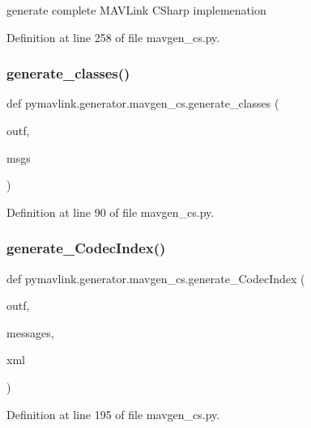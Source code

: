\begin{DoxyVerb}generate complete MAVLink CSharp implemenation\end{DoxyVerb}
 

Definition at line 258 of file mavgen\+\_\+cs.\+py.

\mbox{\label{namespacepymavlink_1_1generator_1_1mavgen__cs_a07bde4c2a35f369eeeda973364b5ef19}} 
\subsubsection{\texorpdfstring{generate\_classes()}{generate\_classes()}}
{\footnotesize\ttfamily def pymavlink.\+generator.\+mavgen\+\_\+cs.\+generate\+\_\+classes (\begin{DoxyParamCaption}\item[{}]{outf,  }\item[{}]{msgs }\end{DoxyParamCaption})}



Definition at line 90 of file mavgen\+\_\+cs.\+py.

\mbox{\label{namespacepymavlink_1_1generator_1_1mavgen__cs_a0786f1048124c0599ae8ddf33077a201}} 
\subsubsection{\texorpdfstring{generate\_CodecIndex()}{generate\_CodecIndex()}}
{\footnotesize\ttfamily def pymavlink.\+generator.\+mavgen\+\_\+cs.\+generate\+\_\+\+Codec\+Index (\begin{DoxyParamCaption}\item[{}]{outf,  }\item[{}]{messages,  }\item[{}]{xml }\end{DoxyParamCaption})}



Definition at line 195 of file mavgen\+\_\+cs.\+py.

